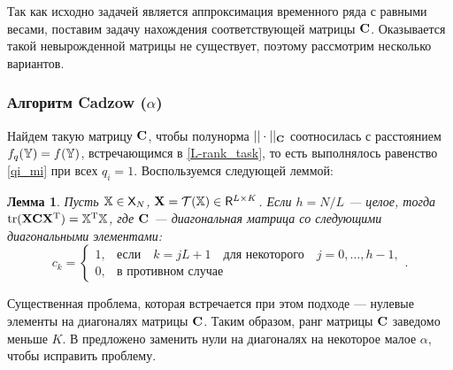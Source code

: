 \documentclass[12pt,a4paper,fleqn,leqno]{article}
\DeclareMathOperator{\tr}{tr}
\begin{document}
Так как исходно задачей является аппроксимация временного ряда с равными весами, поставим задачу нахождения соответствующей матрицы $\mathbf{C}$.
Оказывается такой невырожденной матрицы не существует, поэтому рассмотрим несколько вариантов.

\subsubsection{Алгоритм Cadzow ($\alpha$)}
\label{sec:cadzow_alpha}
Найдем такую матрицу $\mathbf{C}$, чтобы полунорма $||\cdot||_{\mathbf{C}}$ соотносилась с расстоянием $f_q(\mathbb{Y}) = f(\mathbb{Y})$, встречающимся в \eqref{L-rank_task}, то есть выполнялось равенство \eqref{qi_mi} при всех $q_i = 1$. Воспользуемся следующей леммой:
\newtheorem{lemma}{Лемма}
\begin{lemma}\label{zhiglemma}\cite{Gillard2014}
Пусть $\mathbb{X} \in \mathsf{X}_N$, $\mathbf{X} = \mathcal{T}(\mathbb{X}) \in \mathsf{R}^{L \times K}$. Если $h = N/L$ --- целое, тогда $\tr(\bfX \bfC \bfX^\rmT) = \tsX^\rmT \tsX$, где $\mathbf{C}$ --- диагональная матрица со следующими диагональными элементами:
\begin{equation*}
c_k = \begin{cases}
1, & \text{если} \quad k = jL+1 \quad \text{для некоторого} \quad j = 0, \ldots, h-1, \\
0, & \text{в противном случае}
\end{cases}.
\end{equation*}
\end{lemma}

Существенная проблема, которая встречается при этом подходе --- нулевые элементы на диагоналях матрицы $\mathbf{C}$. Таким образом, ранг матрицы $\mathbf{C}$ заведомо меньше $K$. В \cite{Gillard2014} предложено заменить нули на диагоналях на некоторое малое $\alpha$, чтобы исправить проблему.
\end{document}
